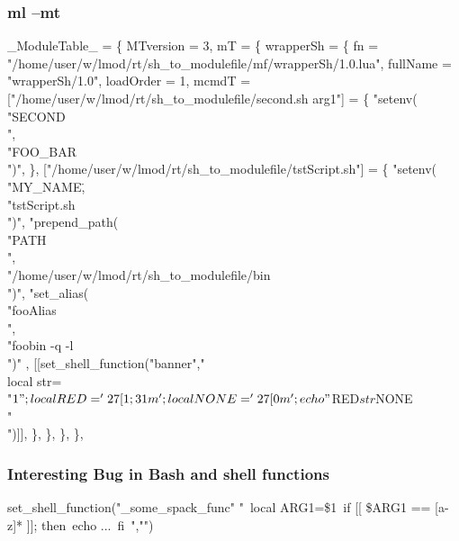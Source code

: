 \documentclass{beamer}
\begin{document}
\begin{frame}[fragile]
  \frametitle{ml --mt}
    {\tiny
\begin{semiverbatim}
\_ModuleTable\_ = \{
  MTversion = 3,
  mT = \{
    wrapperSh = \{
      fn = "/home/user/w/lmod/rt/sh_to_modulefile/mf/wrapperSh/1.0.lua",
      fullName = "wrapperSh/1.0",
      loadOrder = 1,
      mcmdT = {
        ["/home/user/w/lmod/rt/sh_to_modulefile/second.sh arg1"] = \{
          "setenv(\\"SECOND\\",\\"FOO_BAR\\")",
        \},
        ["/home/user/w/lmod/rt/sh_to_modulefile/tstScript.sh"] = \{
          "setenv(\\"MY_NAME\",\\"tstScript.sh\\")",
          "prepend_path(\\"PATH\\",\\"/home/user/w/lmod/rt/sh_to_modulefile/bin\\")",
          "set_alias(\\"fooAlias\\",\\"foobin -q -l\\")"
          , [[set_shell_function("banner"," \\
    local str=\\"$1\\";\\
    local RED='\\27[1;31m';\\
    local NONE='\\27[0m';\\
    echo \\"${RED}${str}${NONE}\\"\\
")]], 
        \},
      \},
    \},
  \},
}
\end{semiverbatim}
    }
\end{frame}

\begin{frame}[fragile]
  \frametitle{Interesting Bug in Bash and shell functions}
    {\tiny
\begin{semiverbatim}
    set_shell_function("_some_spack_func" "\
       local ARG1=\$1\
       if [[ \$ARG1 == {\color{red}[a-z]*} ]]; then\
         echo ...\
         fi\
    ","")
\end{semiverbatim}
    }
\end{frame}
\end{document}
